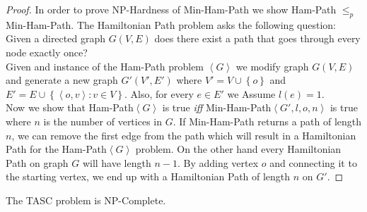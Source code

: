 \begin{proof}
In order to prove NP-Hardness of Min-Ham-Path we show Ham-Path $\leq_p$ Min-Ham-Path. The Hamiltonian Path problem asks the following question: Given a directed graph $G(V,E)$ does there exist a path that goes through every node exactly once?\\

Given and instance of the Ham-Path problem $\left\langle G \right\rangle$ we modify graph $G(V,E)$ and generate a new graph $G'(V', E')$ where $V' = V \cup \left\{ o \right\}$ and $E' = E \cup \left\{ \left\langle o, v \right\rangle : v \in V \right\}$. Also, for every $e \in E'$ we Assume $l(e) = 1$.\\

Now we show that Ham-Path$\left\langle G \right\rangle$ is true \emph{iff} Min-Ham-Path$\left\langle G', l, o, n \right\rangle$ is true where $n$ is the number of vertices in $G$. If Min-Ham-Path returns a path of length $n$, we can remove the first edge from the path which will result in a Hamiltonian Path for the Ham-Path$\left\langle G \right\rangle$ problem. On the other hand every Hamiltonian Path on graph $G$ will have length $n-1$. By adding vertex $o$ and connecting it to the starting vertex, we end up with a Hamiltonian Path of length $n$ on $G'$.
\end{proof}

\begin{theorem}
\label{th:TASC}
The TASC problem is NP-Complete.
\end{theorem}

